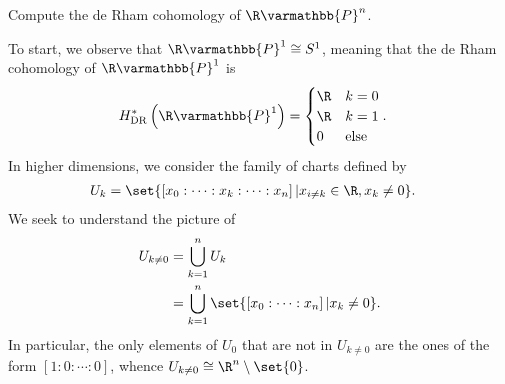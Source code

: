 \documentclass[10pt]{mypackage}
\renewcommand*{\mathbb}[1]{\varmathbb{#1}}
\begin{document}
\begin{problem}[Problem 3]
  Compute the de Rham cohomology of $\R\mathbb{P}^{n}$.
\end{problem}
\begin{solution}
  To start, we observe that $\R\mathbb{P}^{1}\cong S^{1}$, meaning that the de Rham cohomology of $\R\mathbb{P}^{1}$ is
  \begin{align*}
    H^{\ast}_{\operatorname{DR}}\left( \R\mathbb{P}^{1} \right) &= \begin{cases}
      \R & k = 0\\
      \R & k = 1\\
      0 & \text{else}
    \end{cases}.
  \end{align*}
  In higher dimensions, we consider the family of charts defined by
  \begin{align*}
    U_k &= \set{\left[ x_0:\cdots : x_{k} : \cdots : x_{n} \right] | x_{i\neq k}\in\R, x_k\neq 0}.
  \end{align*}
  We seek to understand the picture of
  \begin{align*}
    U_{k\neq 0} &= \bigcup_{k=1}^{n} U_k\\
                &= \bigcup_{k=1}^{n}\set{\left[ x_0 : \cdots : x_n \right] | x_k\neq 0}.
  \end{align*}
  In particular, the only elements of $U_0$ that are not in $U_{k\neq 0}$ are the ones of the form $\left[ 1:0:\cdots:0 \right]$, whence $U_{k\neq 0}\cong \R^{n}\setminus \set{0}$.\newline


\end{solution}
\end{document}
